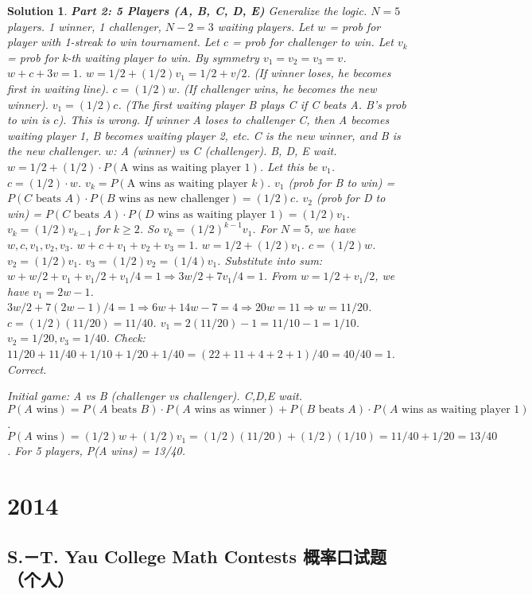 \documentclass[12pt]{amsart}
\newtheorem*{solution}{Solution}
\begin{document}
\begin{solution}
\textbf{Part 2: 5 Players (A, B, C, D, E)}
Generalize the logic. $N=5$ players. 1 winner, 1 challenger, $N-2=3$ waiting players.
Let $w$ = prob for player with 1-streak to win tournament.
Let $c$ = prob for challenger to win.
Let $v_k$ = prob for k-th waiting player to win. By symmetry $v_1=v_2=v_3=v$.
$w+c+3v=1$.
$w = 1/2 + (1/2) v_1 = 1/2+v/2$. (If winner loses, he becomes first in waiting line).
$c = (1/2) w$. (If challenger wins, he becomes the new winner).
$v_1 = (1/2) c$. (The first waiting player B plays C if C beats A. B's prob to win is $c$). This is wrong.
If winner A loses to challenger C, then A becomes waiting player 1, B becomes waiting player 2, etc. C is the new winner, and B is the new challenger.
$w$: A (winner) vs C (challenger). B, D, E wait.
$w = 1/2 + (1/2) \cdot P(\text{A wins as waiting player 1})$. Let this be $v_1$.
$c = (1/2) \cdot w$.
$v_k = P(\text{A wins as waiting player } k)$.
$v_1$ (prob for B to win) = $P(C \text{ beats } A) \cdot P(B \text{ wins as new challenger}) = (1/2)c$.
$v_2$ (prob for D to win) = $P(C \text{ beats } A) \cdot P(D \text{ wins as waiting player 1}) = (1/2)v_1$.
$v_k = (1/2)v_{k-1}$ for $k \ge 2$.
So $v_k = (1/2)^{k-1} v_1$.
For $N=5$, we have $w, c, v_1, v_2, v_3$.
$w+c+v_1+v_2+v_3 = 1$.
$w=1/2+(1/2)v_1$.
$c=(1/2)w$.
$v_2=(1/2)v_1$.
$v_3=(1/2)v_2=(1/4)v_1$.
Substitute into sum: $w + w/2 + v_1 + v_1/2 + v_1/4 = 1 \Rightarrow 3w/2 + 7v_1/4 = 1$.
From $w=1/2+v_1/2$, we have $v_1=2w-1$.
$3w/2 + 7(2w-1)/4 = 1 \Rightarrow 6w + 14w - 7 = 4 \Rightarrow 20w = 11 \Rightarrow w=11/20$.
$c = (1/2)(11/20) = 11/40$.
$v_1 = 2(11/20)-1 = 11/10 - 1 = 1/10$.
$v_2 = 1/20, v_3=1/40$.
Check: $11/20 + 11/40 + 1/10 + 1/20 + 1/40 = (22+11+4+2+1)/40 = 40/40=1$. Correct.

Initial game: A vs B (challenger vs challenger). C,D,E wait.
$P(A \text{ wins}) = P(A \text{ beats } B) \cdot P(A \text{ wins as winner}) + P(B \text{ beats } A) \cdot P(A \text{ wins as waiting player 1})$.
$P(A \text{ wins}) = (1/2)w + (1/2)v_1 = (1/2)(11/20) + (1/2)(1/10) = 11/40 + 1/20 = 13/40$.
For 5 players, P(A wins) = 13/40.
\end{solution}

\section*{2014}
\subsection*{S.－T. Yau College Math Contests 概率口试题（个人）}
\end{document}
